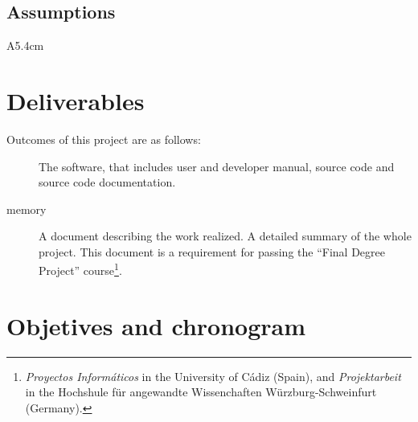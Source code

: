 \documentclass[twocolumn]{article}
\begin{document}
\subsection{Assumptions}
\begin{condlist}{A}{5.4cm}
\end{condlist}

\section{Deliverables}
Outcomes of this project are as follows:

\begin{description}
  \item[\fav] The \fav software, that includes user and developer
    manual, source code and source code documentation.
  \item[\favp memory] A document describing the work realized. A
    detailed summary of the whole project. This document is a
    requirement for passing the ``Final Degree Project''
    course\footnote{\textit{Proyectos Informáticos} in the University
      of Cádiz (Spain), and \textit{Projektarbeit} in the Hochshule
      für angewandte Wissenchaften Würzburg-Schweinfurt (Germany).}.
\end{description}

\section{Objetives and chronogram}
\end{document}
